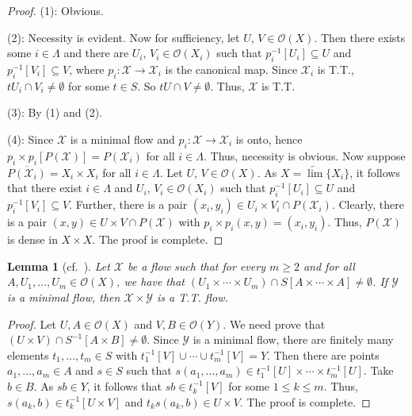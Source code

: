\documentclass[12pt,final,3p,times]{elsarticle}
\newtheorem{slem}[sthm]{Lemma}
\theoremstyle{definition}
\numberwithin{equation}{section}
\begin{document}
\begin{proof}
(1): Obvious.

(2): Necessity is evident. Now for sufficiency, let $U$, $V\in\mathscr{O}(X)$. Then there exists some $i\in\Lambda$ and there are $U_i$, $V_i\in \mathscr{O}(X_i)$ such that $p_i^{-1}[U_i]\subseteq U$ and $p_i^{-1}[V_i]\subseteq V$, where $p_i\colon\mathscr{X}\rightarrow\mathscr{X}_i$ is the canonical map. Since $\mathscr{X}_i$ is T.T., $tU_i\cap V_i\not=\emptyset$ for some $t\in S$. So $tU\cap V\not=\emptyset$. Thus, $\mathscr{X}$ is T.T.

(3): By (1) and (2).

(4): Since $\mathscr{X}$ is a minimal flow and $p_i\colon\mathscr{X}\rightarrow\mathscr{X}_i$ is onto, hence $p_i\times p_i[P(\mathscr{X})]=P(\mathscr{X}_i)$ for all $i\in\Lambda$. Thus, necessity is obvious. Now suppose $\overline{P(\mathscr{X}_i)}=X_i\times X_i$ for all $i\in\Lambda$. Let $U$, $V\in\mathscr{O}(X)$. As $X=\underleftarrow{\lim}\{X_i\}$, it follows that there exist $i\in\Lambda$ and $U_i$, $V_i\in \mathscr{O}(X_i)$ such that $p_i^{-1}[U_i]\subseteq U$ and $p_i^{-1}[V_i]\subseteq V$. Further, there is a pair $(x_i,y_i)\in U_i\times V_i\cap P(\mathscr{X}_i)$. Clearly, there is a pair $(x,y)\in U\times V\cap P(\mathscr{X})$ with $p_i\times p_i(x,y)=(x_i,y_i)$. Thus, $P(\mathscr{X})$ is dense in $X\times X$.
The proof is complete.
\end{proof}

\begin{slem}[{cf.~\cite[Prop.~II.2.1]{G76}}]\label{Q5.9}
Let $\mathscr{X}$ be a flow such that for every $m\ge2$ and for all $A, U_1, \dotsc, U_m\in\mathscr{O}(X)$, we have that
$(U_1\times\dotsm\times U_m)\cap S[A\times\dotsm\times A]\not=\emptyset$.
If $\mathscr{Y}$ is a minimal flow, then $\mathscr{X}\times\mathscr{Y}$ is a T.T. flow.
\end{slem}

\begin{proof}
Let $U, A\in\mathscr{O}(X)$ and $V, B\in \mathscr{O}(Y)$. We need prove that $(U\times V)\cap S^{-1}[A\times B]\not=\emptyset$.
Since $\mathscr{Y}$ is a minimal flow, there are finitely many elements $t_1, \dotsc,t_m\in S$ with $t_1^{-1}[V]\cup\dotsm\cup t_m^{-1}[V]=Y$. Then there are points $a_1, \dotsc,a_m\in A$ and $s\in S$ such that
$s(a_1, \dotsc,a_m)\in t_1^{-1}[U]\times\dotsm\times t_m^{-1}[U]$. Take $b\in B$. As $sb\in Y$, it follows that $sb\in t_k^{-1}[V]$ for some $1\le k\le m$. Thus,
$s(a_k, b)\in t_k^{-1}[U\times V]$ and $t_ks(a_k,b)\in U\times V$. The proof is complete.
\end{proof}
\end{document}
